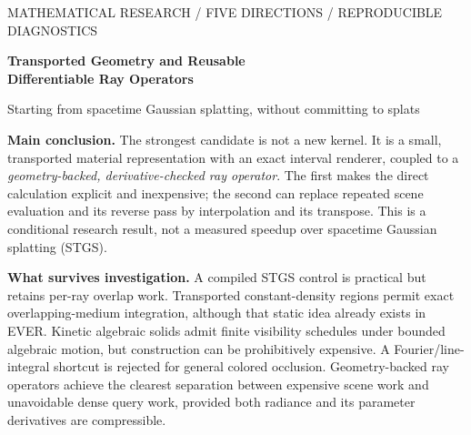 \documentclass[11pt,letterpaper]{article}
\begin{document}
\thispagestyle{fancy}
{\sffamily\color{ink}\small MATHEMATICAL RESEARCH / FIVE DIRECTIONS / REPRODUCIBLE DIAGNOSTICS}\par
\vspace{5pt}
{\LARGE\bfseries Transported Geometry and Reusable\\Differentiable Ray Operators}\par
{\large Starting from spacetime Gaussian splatting, without committing to splats}\par
\vspace{3pt}
\textbf{Main conclusion.} The strongest candidate is not a new kernel. It is a small, transported material representation with an exact interval renderer, coupled to a \emph{geometry-backed, derivative-checked ray operator}. The first makes the direct calculation explicit and inexpensive; the second can replace repeated scene evaluation and its reverse pass by interpolation and its transpose. This is a conditional research result, not a measured speedup over spacetime Gaussian splatting (STGS).

\textbf{What survives investigation.} A compiled STGS control is practical but retains per-ray overlap work. Transported constant-density regions permit exact overlapping-medium integration, although that static idea already exists in EVER. Kinetic algebraic solids admit finite visibility schedules under bounded algebraic motion, but construction can be prohibitively expensive. A Fourier/line-integral shortcut is rejected for general colored occlusion. Geometry-backed ray operators achieve the clearest separation between expensive scene work and unavoidable dense query work, provided both radiance and its parameter derivatives are compressible.
\end{document}
